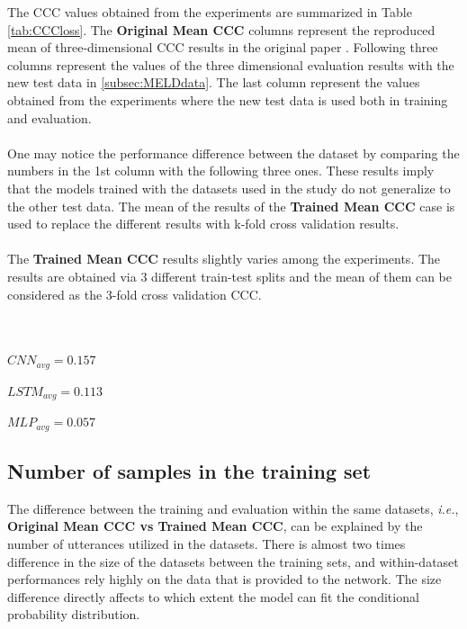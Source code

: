 \documentclass[a4paper,11pt]{article}
\begin{document}
\indent The CCC values obtained from the experiments are summarized in Table \ref{tab:CCCloss}. The \textbf{Original Mean CCC} columns represent the reproduced mean of three-dimensional CCC results in the original paper \cite{atmaja2020deep}. Following three columns represent the values of the three dimensional evaluation results with the new test data in \ref{subsec:MELDdata}. The last column represent the values obtained from the experiments where the new test data is used both in training and evaluation.
\\
\\
One may notice the performance difference between the dataset by comparing the numbers in the 1st column with the following three ones. These results imply that the models trained with the datasets used in the study do not generalize to the other test data. The mean of the results of the \textbf{Trained Mean CCC} case is used to replace the different results with k-fold cross validation results. 
\\
\\
The  \textbf{Trained Mean CCC} results slightly varies among the experiments. The results are obtained via 3 different train-test splits and the mean of them can be considered as the 3-fold cross validation CCC. \\
\\
\\
\begin{minipage}{0.3\textwidth}
    \centering
    $CNN_{avg} = 0.157$            
\end{minipage}
\begin{minipage}{0.3\textwidth}
    \centering
    $LSTM_{avg} = 0.113$             
\end{minipage}
\begin{minipage}{0.3\textwidth}
    \centering
   $MLP_{avg} = 0.057$ 
\end{minipage}

\pagebreak 

\subsection{Number of samples in the training set}
The difference between the training and evaluation within the same datasets, \textit{i.e.}, \textbf{Original Mean CCC vs Trained Mean CCC}, can be explained by the number of utterances utilized in the datasets. There is almost two times difference in the size of the datasets between the training sets, and within-dataset performances rely highly on the data that is provided to the network. The size difference directly affects to which extent the model can fit the conditional probability distribution.
\end{document}
